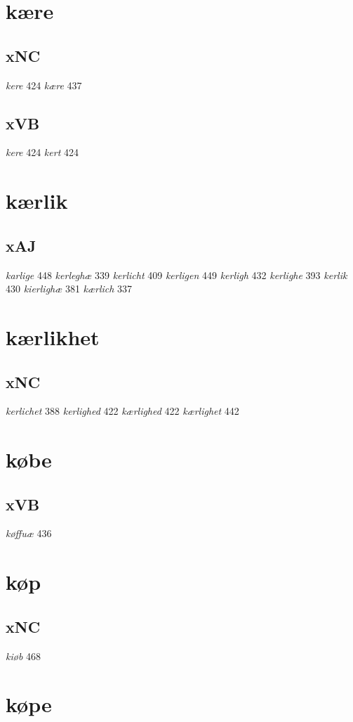 \documentclass[a4paper,twocolumn]{article}
\begin{document}
\section{kære}
\label{sec:org1ee3fd5}
\subsection{xNC}
\label{sec:org7b4c9ea}
\emph{kere} 424 \emph{kære} 437 
\subsection{xVB}
\label{sec:org1daa845}
\emph{kere} 424 \emph{kert} 424 
\section{kærlik}
\label{sec:org23d2646}
\subsection{xAJ}
\label{sec:org9de3305}
\emph{karlige} 448 \emph{kerleghæ} 339 \emph{kerlicht} 409 \emph{kerligen} 449 \emph{kerligh} 432 \emph{kerlighe} 393 \emph{kerlik} 430 \emph{kierlighæ} 381 \emph{kærlich} 337 
\section{kærlikhet}
\label{sec:orgfc1dee5}
\subsection{xNC}
\label{sec:orgd9befb3}
\emph{kerlichet} 388 \emph{kerlighed} 422 \emph{kærlighed} 422 \emph{kærlighet} 442 
\section{købe}
\label{sec:org7a4dbc5}
\subsection{xVB}
\label{sec:org56f979c}
\emph{køffuæ} 436 
\section{køp}
\label{sec:org3011381}
\subsection{xNC}
\label{sec:org9bc630d}
\emph{kiøb} 468 
\section{køpe}
\label{sec:orgac522ff}
\end{document}
